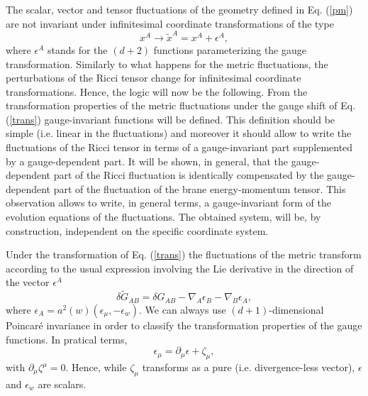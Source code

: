 \documentclass[a4paper,12pt]{article}
\begin{document}
The scalar, vector and tensor fluctuations of the geometry defined in 
Eq. (\ref{pm}) are not invariant under infinitesimal coordinate 
transformations of the type 
\begin{equation}
x^{A} \rightarrow \tilde{x}^{A} = x^{A} + \epsilon^{A},
\label{trans}
\end{equation}
where $\epsilon^{A}$ stands for the $(d+2)$ functions 
parameterizing the gauge transformation.
Similarly to what happens for the metric 
fluctuations, the perturbations of the Ricci tensor change 
for infinitesimal coordinate transformations. 
Hence, the logic will now be the following.
 From the  transformation properties of 
the metric fluctuations under the gauge shift of Eq. (\ref{trans}) 
gauge-invariant functions will be defined. This definition 
should be simple (i.e. linear in the fluctuations) and moreover 
it should allow to write the fluctuations 
of the Ricci tensor in terms of a gauge-invariant part supplemented 
by a gauge-dependent part. It will be shown, in general, that 
the gauge-dependent part of the Ricci fluctuation is identically 
  compensated by the gauge-dependent part of the fluctuation of the 
brane energy-momentum tensor. This observation allows to 
write, in general terms, a gauge-invariant form of the 
evolution equations of the 
fluctuations. The obtained system, will be, by construction, 
independent on the specific coordinate system.


Under the transformation of Eq. (\ref{trans}) the 
fluctuations of the metric transform according to the 
usual expression involving the Lie derivative in the direction 
of the vector $\epsilon^{A}$
\begin{equation}
\delta \tilde{G}_{A B} = \delta G_{AB} - \nabla_{A} \epsilon_{B} - \nabla_{B}
\epsilon_{A},
\label{liederiv}
\end{equation}
where $\epsilon_A = a^2(w) (\epsilon_{\mu}, -\epsilon_{w})$. We can always 
use $(d+1)$-dimensional Poincar\'e invariance in order to 
classify the transformation properties of the gauge functions. In pratical 
terms, 
\begin{equation}
\epsilon_{\mu} = \partial_{\mu} \epsilon + \zeta_{\mu},
\end{equation}
with $\partial_{\mu} \zeta^{\mu} =0$. Hence, while $\zeta_{\mu}$ 
transforms as a pure (i.e. divergence-less vector), $\epsilon $ and 
$\epsilon_{w}$ are scalars.
\end{document}
